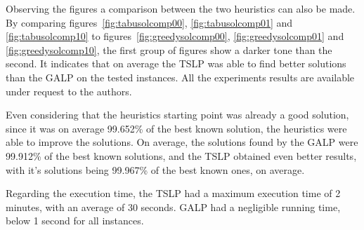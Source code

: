 Observing the figures a comparison between the two heuristics can also be made.
By comparing figures~\ref{fig:tabusolcomp00}, \ref{fig:tabusolcomp01} and \ref{fig:tabusolcomp10} to 
figures~\ref{fig:greedysolcomp00}, \ref{fig:greedysolcomp01} and \ref{fig:greedysolcomp10}, the first group 
of figures show a darker tone than the second. It indicates that on average the TSLP was able to find better
solutions than the GALP on the tested instances. All the experiments results are available under request to the authors.

Even considering that the heuristics starting point was already a good solution, since it was on average
99.652\% of the best known solution, the heuristics were able to improve the solutions. On average, 
the solutions found by the GALP were 99.912\% of the best known solutions, and the TSLP obtained 
even better results, with it's solutions being 99.967\% of the best known ones, on average.

Regarding the execution time, the TSLP had a maximum execution time of 2 minutes, with an average of 30 seconds.
GALP had a negligible running time, below 1 second for all instances.
